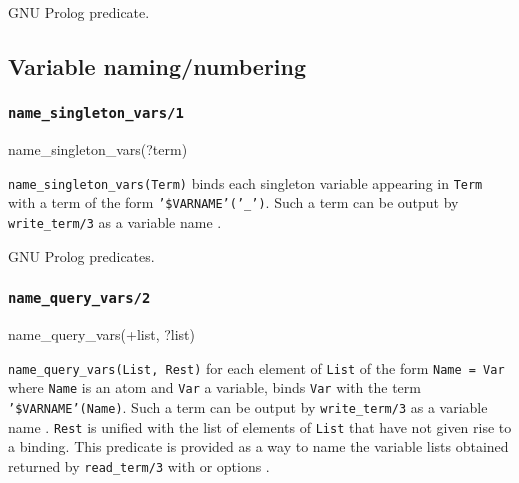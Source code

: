 GNU Prolog predicate.

\subsection{Variable naming/numbering}
\label{Variable-naming/numbering}

\subsubsection{\texttt{name\_singleton\_vars/1}}
\label{name-singleton-vars/1}

\begin{TemplatesOneCol}
name\_singleton\_vars(?term)

\end{TemplatesOneCol}

\Description

\texttt{name\_singleton\_vars(Term)} binds each singleton variable appearing
in \texttt{Term} with a term of the form \texttt{'\$VARNAME'('\_')}. Such a
term can be output by \texttt{write\_term/3} as a variable name
.

\PlErrorsNone

\Portability

GNU Prolog predicates.

\subsubsection{\texttt{name\_query\_vars/2}}
\label{name-query-vars/2}

\begin{TemplatesOneCol}
name\_query\_vars(+list, ?list)

\end{TemplatesOneCol}

\Description

\texttt{name\_query\_vars(List, Rest)} for each element of \texttt{List} of
the form \texttt{Name = Var} where \texttt{Name} is an atom and \texttt{Var}
a variable, binds \texttt{Var} with the term \texttt{'\$VARNAME'(Name)}.
Such a term can be output by \texttt{write\_term/3} as a variable name
. \texttt{Rest} is unified with the list of elements of
\texttt{List} that have not given rise to a binding. This predicate is
provided as a way to name the variable lists obtained returned by
\texttt{read\_term/3} with  or
 options .

